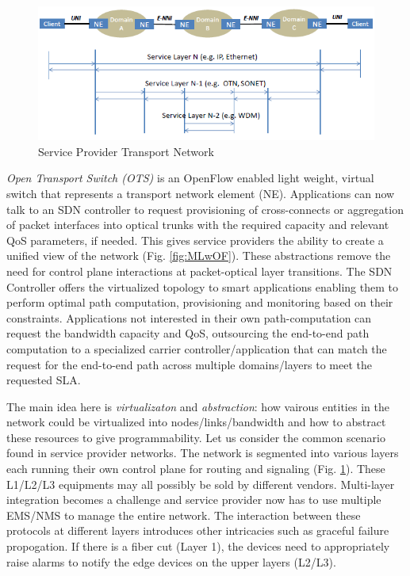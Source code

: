 \documentclass{sig-alternate-10pt}
\begin{document}
	\begin{figure}[htb]
	\centering
	\includegraphics[scale=0.50]{MLwoOF.png}
	\caption{Service Provider Transport Network}
	\label{fig:MLwoOF}
	\end{figure}

	\textit{Open Transport Switch (OTS)} is an OpenFlow \cite{OF1.0} enabled light weight, virtual switch
	that represents a transport network element (NE).  Applications can now talk to an SDN controller to request
	provisioning of cross-connects or aggregation of packet interfaces into optical trunks with the required
	capacity and relevant QoS parameters, if needed. This gives service providers the ability to create a unified view  of the
	network (Fig. \ref{fig:MLwOF}). These abstractions remove the need for control plane interactions at packet-optical layer transitions.
	The SDN Controller offers the virtualized topology to smart applications enabling them to perform optimal path computation,
	provisioning and monitoring based on their constraints. Applications not interested in their own path-computation can request the
	bandwidth capacity and QoS, outsourcing the end-to-end path computation to a specialized carrier controller/application that can match the request for the end-to-end path across multiple domains/layers to meet the requested SLA. 

\iffalse
	The main idea here is \emph{virtualizaton} and \emph{abstraction}: how vairous entities in the network could 
	be virtualized into nodes/links/bandwidth and how to abstract these resources to give programmability.
	Let us consider the common scenario found in service provider networks. The network is segmented into
	various layers each running their own control plane for routing and signaling (Fig. \ref{fig:MLwoOF}).
	These L1/L2/L3 equipments may all possibly be sold by different vendors. Multi-layer integration becomes
	a challenge and service provider now has to use multiple EMS/NMS to manage the entire network. The
	interaction between these protocols at different layers introduces other intricacies such as graceful
	failure propogation. If there is a fiber cut (Layer 1), the devices need to appropriately raise alarms to
	notify the edge devices on the upper layers (L2/L3). \\
\end{document}
